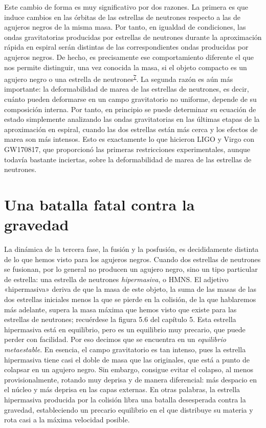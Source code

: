 Este cambio de forma es muy significativo por dos razones. La primera es que induce cambios en las órbitas de las estrellas de neutrones respecto a las de agujeros negros de la misma masa. Por tanto, en igualdad de condiciones, las ondas gravitatorias producidas por estrellas de neutrones durante la aproximación rápida en espiral serán distintas de las correspondientes ondas producidas por agujeros negros. De hecho, es precisamente ese comportamiento diferente el que nos permite distinguir, una vez conocida la masa, si el objeto compacto es un agujero negro o una estrella de neutrones\textsuperscript{\hyperlink{note:08-07}{7}}. La segunda razón es aún más importante: la deformabilidad de marea de las estrellas de neutrones, es decir, cuánto pueden deformarse en un campo gravitatorio no uniforme, depende de su composición interna. Por tanto, en principio se puede determinar su ecuación de estado simplemente analizando las ondas gravitatorias en las últimas etapas de la aproximación en espiral, cuando las dos estrellas están más cerca y los efectos de marea son más intensos. Esto es exactamente lo que hicieron LIGO y Virgo con GW170817, que proporcionó las primeras restricciones experimentales, aunque todavía bastante inciertas, sobre la deformabilidad de marea de las estrellas de neutrones.

\section{Una batalla fatal contra la gravedad}\label{sec:08-remnant}

La dinámica de la tercera fase, la fusión y la posfusión, es decididamente distinta de lo que hemos visto para los agujeros negros. Cuando dos estrellas de neutrones se fusionan, por lo general no producen un agujero negro, sino un tipo particular de estrella: una estrella de neutrones \emph{hipermasiva}, o HMNS. El adjetivo «hipermasiva» deriva de que la masa de este objeto, la suma de las masas de las dos estrellas iniciales menos la que se pierde en la colisión, de la que hablaremos más adelante, supera la masa máxima que hemos visto que existe para las estrellas de neutrones; recuérdese la figura 5.6 del capítulo 5. Esta estrella hipermasiva está en equilibrio, pero es un equilibrio muy precario, que puede perder con facilidad. Por eso decimos que se encuentra en un \emph{equilibrio metaestable}. En esencia, el campo gravitatorio es tan intenso, pues la estrella hipermasiva tiene casi el doble de masa que las originales, que está a punto de colapsar en un agujero negro. Sin embargo, consigue evitar el colapso, al menos provisionalmente, rotando muy deprisa y de manera diferencial: más despacio en el núcleo y más deprisa en las capas externas. En otras palabras, la estrella hipermasiva producida por la colisión libra una batalla desesperada contra la gravedad, estableciendo un precario equilibrio en el que distribuye su materia y rota casi a la máxima velocidad posible.

